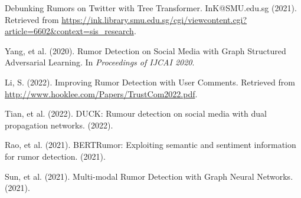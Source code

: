 \documentclass[12pt,a4paper]{report}
\begin{document}
\begin{thebibliography}{99}
Debunking Rumors on Twitter with Tree Transformer.
\newblock InK@SMU.edu.sg (2021).
\newblock Retrieved from \url{https://ink.library.smu.edu.sg/cgi/viewcontent.cgi?article=6602&context=sis_research}.

Yang, et al. (2020).
\newblock Rumor Detection on Social Media with Graph Structured Adversarial Learning.
\newblock In \emph{Proceedings of IJCAI 2020}.

Li, S. (2022).
\newblock Improving Rumor Detection with User Comments.
\newblock Retrieved from \url{http://www.hooklee.com/Papers/TrustCom2022.pdf}.

Tian, et al. (2022).
\newblock DUCK: Rumour detection on social media with dual propagation networks.
\newblock (2022).

Rao, et al. (2021).
\newblock BERTRumor: Exploiting semantic and sentiment information for rumor detection.
\newblock (2021).

Sun, et al. (2021).
\newblock Multi-modal Rumor Detection with Graph Neural Networks.
\newblock (2021).

\end{thebibliography}
\end{document}
